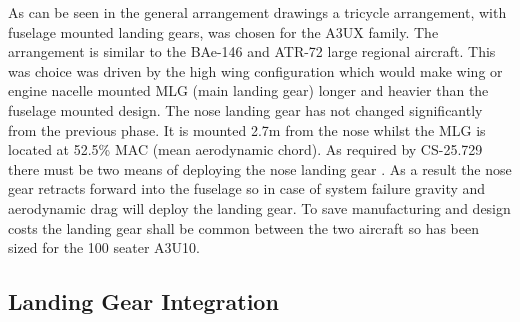 \documentclass[11pt]{article}
\begin{document}
As can be seen in the general arrangement drawings a tricycle arrangement, with fuselage mounted landing gears, was chosen for the A3UX family. The arrangement is similar to the BAe-146 and ATR-72 large regional aircraft. This was choice was driven by the high wing configuration which would make wing or engine nacelle mounted MLG (main landing gear) longer and heavier than the fuselage mounted design. The nose landing gear has not changed significantly from the previous phase. It is mounted 2.7m from the nose whilst the MLG is located at 52.5\% MAC (mean aerodynamic chord). As required by CS-25.729 there must be two means of deploying the nose landing gear \cite{CS25}. As a result the nose gear retracts forward into the fuselage so in case of system failure gravity and aerodynamic drag will deploy the landing gear. To save manufacturing and design costs the landing gear shall be common between the two aircraft so has been sized for the 100 seater A3U10.  

\subsection{Landing Gear Integration}
\end{document}
